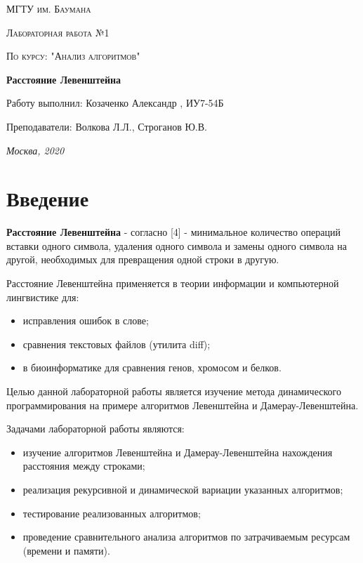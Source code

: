 \documentclass[12pt]{report}
\begin{document}
\begin{titlepage}
	\centering
	{\scshape\LARGE МГТУ им. Баумана \par}
	\vspace{3cm}
	{\scshape\Large Лабораторная работа №1\par}
	\vspace{0.5cm}	
	{\scshape\Large По курсу: "Анализ алгоритмов"\par}
	\vspace{1.5cm}
	{\huge\bfseries Расстояние Левенштейна\par}
	\vspace{2cm}
	\Large Работу выполнил: Козаченко Александр , ИУ7-54Б\par
	\vspace{0.5cm}
	\Large Преподаватели:  Волкова Л.Л., Строганов Ю.В.\par

	\vfill
	\large \textit {Москва, 2020} \par
\end{titlepage}

\tableofcontents

\newpage
\chapter*{Введение}
\textbf{Расстояние Левенштейна} - согласно [4] - минимальное количество операций вставки одного символа, удаления одного символа и замены одного символа на другой, необходимых для превращения одной строки в другую.

Расстояние Левенштейна применяется в теории информации и компьютерной лингвистике для:

\begin{itemize}
	\item исправления ошибок в слове;
	\item сравнения текстовых файлов (утилита diff);
	\item в биоинформатике для сравнения генов, хромосом и белков.
\end{itemize}

Целью данной лабораторной работы является изучение метода динамического программирования на примере алгоритмов
Левенштейна и Дамерау-Левенштейна. 

Задачами лабораторной работы являются:
\begin{itemize}
  	\item изучение алгоритмов Левенштейна и Дамерау-Левенштейна нахождения расстояния между строками;
	\item реализация рекурсивной и динамической вариации указанных алгоритмов; 
	\item тестирование реализованных алгоритмов; 
	\item проведение сравнительного анализа алгоритмов по затрачиваемым ресурсам (времени и памяти).
\end{itemize}
\end{document}
